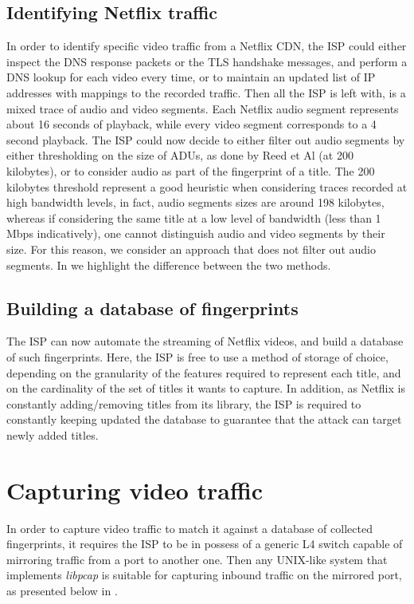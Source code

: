 \subsection{Identifying Netflix traffic}

In order to identify specific video traffic from a Netflix CDN, the ISP could
either inspect the DNS response packets or the TLS handshake messages, and
perform a DNS lookup for each video every time, or to maintain an updated list
of IP addresses with mappings to the recorded traffic. Then all the ISP is left
with, is a mixed trace of audio and video segments. Each Netflix audio segment
represents about 16 seconds of playback, while every video segment corresponds
to a 4 second playback. The ISP could now decide to either filter out audio
segments by either thresholding on the size of ADUs, as done by Reed et Al (at
200 kilobytes), or to consider audio as part of the fingerprint of a title. The
200 kilobytes threshold represent a good heuristic when considering traces
recorded at high bandwidth levels, in fact, audio segments sizes are around 198
kilobytes, whereas if considering the same title at a low level of bandwidth
(less than 1 Mbps indicatively), one cannot distinguish audio and video
segments by their size. For this reason, we consider an approach that does not
filter out audio segments. In  we highlight the difference
between the two methods.

\subsection{Building a database of fingerprints}

The ISP can now automate the streaming of Netflix videos, and build a database
of such fingerprints. Here, the ISP is free to use a method of storage of
choice, depending on the granularity of the features required to represent each
title, and on the cardinality of the set of titles it wants to capture.  In
addition, as Netflix is constantly adding/removing titles from its library, the
ISP is required to constantly keeping updated the database to guarantee that
the attack can target newly added titles.

\section{Capturing video traffic}

In order to capture video traffic to match it against a database of collected
fingerprints, it requires the ISP to be in possess of a generic L4 switch
capable of mirroring traffic from a port to another one. Then any UNIX-like
system that implements \emph{libpcap} is suitable for capturing inbound traffic
on the mirrored port, as presented below in .

